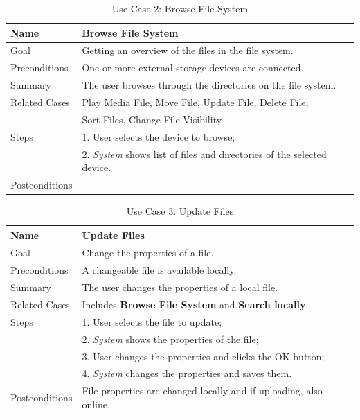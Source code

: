 \begin{table}[h!]
\centering
\begin{tabular}{|l|l|}
\hline
Name & Browse File System\\ \hline
Goal & Getting an overview of the files in the file system.\\ \hline
Preconditions & One or more external storage devices are connected. \\ \hline
Summary & The user browses through the directories on the file system.\\ \hline
Related Cases & Play Media File, Move File, Update File, Delete File, \\ 
              &  Sort Files, Change File Visibility. \\ \hline
Steps &  1. User selects the device to browse; \\
      &  2. \textit{System} shows list of files and directories of the selected device. 
        \\ \hline
Postconditions & -
\\ \hline
\end{tabular}
\caption{Use Case 2: Browse File System}
\label{tab:UC2}
\end{table}

\begin{table}[h!]
\centering
\begin{tabular}{|l|l|}
\hline
Name & Update Files\\ \hline
Goal & Change the properties of a file.\\ \hline
Preconditions & A changeable file is available locally. \\ \hline
Summary & The user changes the properties of a local file.\\ \hline
Related Cases & Includes \textbf{Browse File System} and \textbf{Search locally}. \\ \hline
Steps &  1. User selects the file to update; \\
      &  2. \textit{System} shows the properties of the file; \\ 
      &  3. User changes the properties and clicks the OK button; \\
      &  4. \textit{System} changes the properties and saves them. 
        \\ \hline
Postconditions & File properties are changed locally and if uploading, also online.
\\ \hline
\end{tabular}
\caption{Use Case 3: Update Files}
\label{tab:UC3}
\end{table}

